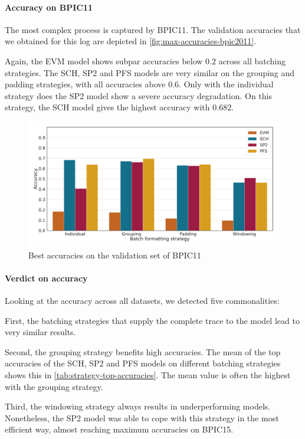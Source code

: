 \paragraph{Accuracy on BPIC11}
The most complex process is captured by BPIC11.
The validation accuracies that we obtained for this log are depicted in \autoref{fig:max-accuracies-bpic2011}.

Again, the EVM model shows subpar accuracies below $0.2$ across all batching strategies.
The SCH, SP2 and PFS models are very similar on the grouping and padding strategies, with all accuracies above $0.6$.
Only with the individual strategy does the SP2 model show a severe accuracy degradation.
On this strategy, the SCH model gives the highest accuracy with $0.682$.

\begin{figure}[!htb]
    \centering
    \includegraphics[width=\textwidth]{gfx/bpic2011/accuracies.pdf}
    \caption{Best accuracies on the validation set of BPIC11}
    \label{fig:max-accuracies-bpic2011}
\end{figure}

\paragraph{Verdict on accuracy}
Looking at the accuracy across all datasets, we detected five commonalities:

First, the batching strategies that supply the complete trace to the model lead to very similar results.

Second, the grouping strategy benefits high accuracies.
The mean of the top accuracies of the SCH, SP2 and PFS models on different batching strategies shows this in \autoref{tab:strategy-top-accuracies}.
The mean value is often the highest with the grouping strategy.

Third, the windowing strategy always results in underperforming models.
Nonetheless, the SP2 model was able to cope with this strategy in the most efficient way, almost reaching maximum accuracies on BPIC15.

